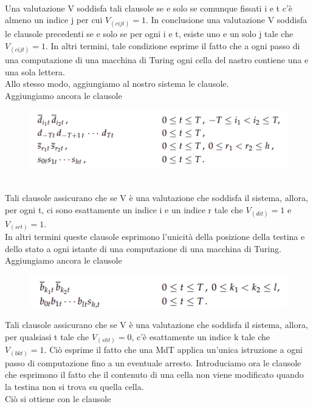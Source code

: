 \\Una valutazione V soddisfa tali clausole se e solo se comunque fissati i e t c’è almeno
un indice j per cui $V_{(cijt)} = 1$. In conclusione una valutazione V soddisfa le clausole precedenti se e solo se per ogni i e t, esiste uno e un solo j tale che $V_{(cijt)} = 1$. In altri termini, tale condizione esprime il fatto che a ogni passo di una computazione di una macchina di Turing ogni cella del nastro contiene una e una sola lettera.
\\Allo stesso modo, aggiungiamo al nostro sistema le clausole.\\
Aggiungiamo ancora le clausole\\
\begin{figure}[htp]
    \centering
    \includegraphics[scale=0.6]{tesi_stile/img/levin5.png}
\end{figure}
\\Tali clausole assicurano che se V è una valutazione che soddisfa il sistema, allora, per ogni t, ci sono esattamente un indice i e un indice r tale che $V_{(dit)} = 1$ e $V_{(srt)} = 1$.
\\In altri termini queste clausole esprimono l’unicità della posizione della testina e dello stato a ogni istante di una computazione di una macchina di Turing. 
\\Aggiungiamo ancora le clausole
\begin{figure}[htp]
    \centering
    \includegraphics[scale=0.6]{tesi_stile/img/levin6.png}
\end{figure}
\newpage
Tali clausole assicurano che se V è una valutazione che soddisfa il sistema, allora, per qualsiasi t tale che $V_{(sht)} = 0$, c’è esattamente un indice k tale che $V_{(bkt)} = 1$. Ciò esprime il fatto che una MdT applica un’unica istruzione a ogni passo di computazione fino a un eventuale arresto. Introduciamo ora le clausole che esprimono il fatto che il contenuto di una cella non viene modificato quando la testina non si trova su quella cella. \\Ciò si ottiene con le clausole
